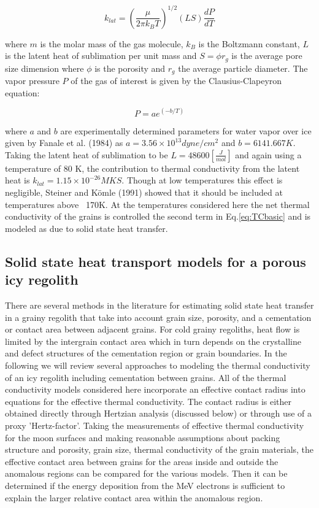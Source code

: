 \documentclass[11pt]{article} %
\begin{document}
	\begin{equation}
	k_{lat} = ( \frac{\mu}{2 \pi k_{B} T})^{1/2}  (L S) \frac{dP}{dT}
	\end{equation}
	
	where $m$ is the molar mass of the gas molecule, $k_{B}$ is the Boltzmann constant, $L$ is the latent heat of sublimation per unit mass and $S = \phi r_{g}$ is the average pore size dimension where $\phi$ is the porosity and $r_{g}$ the average particle diameter. The vapor pressure $P$ of the gas of interest is given by the Clausius-Clapeyron equation:
	 
	 \begin{equation} \label{eqn:CCpres}
	 P = ae^{(-b/T)}
	 \end{equation}
	 
	 where $a$ and $b$ are experimentally determined parameters for water vapor over ice given by Fanale et al. (1984) as $a = 3.56 \times 10^{13} dyne/cm^{2}$ and $b = 6141.667 K$. Taking the latent heat of sublimation to be $L = 48600 [\frac{J}{mol}]$ and again using a temperature of 80 K, the contribution to thermal conductivity from the latent heat is $k_{lat} = 1.15\times10^{-26} MKS$. Though at low temperatures this effect is negligible, Steiner and K\"{o}mle (1991) showed that it should be included at temperatures above ~170K. At the temperatures considered here the net thermal conductivity of the grains is controlled the second term in Eq.\ref{eq:TCbasic} and is modeled as due to solid state heat transfer.

\subsection{Solid state heat transport models for a porous icy regolith}
	There are several methods in the literature for estimating solid state heat transfer in a grainy regolith that take into account grain size, porosity, and a cementation or contact area between adjacent grains. For cold grainy regoliths, heat flow is limited by the intergrain contact area which in turn depends on the crystalline and defect structures of the cementation region or grain boundaries. In the following we will review several approaches to modeling the thermal conductivity of an icy regolith including cementation between grains. All of the thermal conductivity models considered here incorporate an effective contact radius into equations for the effective thermal conductivity. The contact radius is either obtained directly through Hertzian analysis (discussed below) or through use of a proxy 'Hertz-factor'. Taking the measurements of effective thermal conductivity for the moon surfaces and making reasonable assumptions about packing structure and porosity, grain size, thermal conductivity of the grain materials, the effective contact area between grains for the areas inside and outside the anomalous regions can be compared for the various models. Then it can be determined if the energy deposition from the MeV electrons is sufficient to explain the larger relative contact area within the anomalous region.
\end{document}
